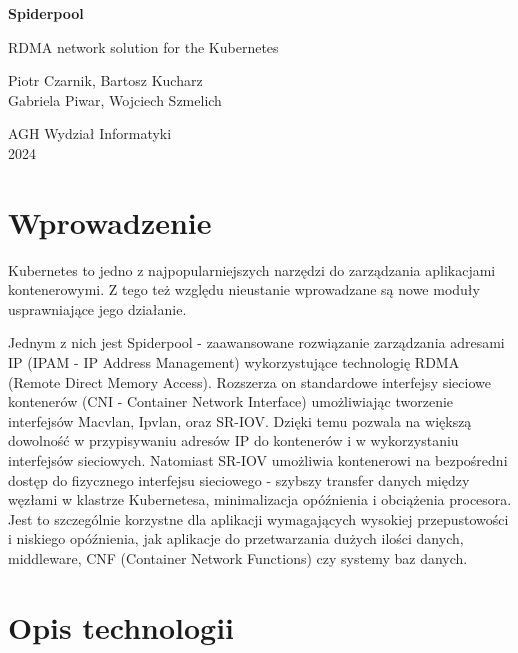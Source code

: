 \documentclass[onecolumn,12pt]{article}
\begin{document}
\begin{titlepage}
\begin{center}
\vspace*{2.5cm}
\Huge
\textbf{Spiderpool}
            
\vspace{0.5cm}
\LARGE
RDMA network solution for the Kubernetes
            
\vspace{1.5cm}

\large
Piotr Czarnik, Bartosz Kucharz
\\Gabriela Piwar, Wojciech Szmelich
              
\vspace{0.8cm}          
\Large
AGH Wydział Informatyki\\
2024    
\end{center}
\end{titlepage}

\tableofcontents
\thispagestyle{empty}
\newpage

\section{Wprowadzenie}
Kubernetes to jedno z najpopularniejszych narzędzi do zarządzania aplikacjami kontenerowymi. 
Z tego też względu nieustanie wprowadzane są nowe moduły usprawniające jego działanie. 

Jednym z nich jest Spiderpool - zaawansowane rozwiązanie zarządzania adresami IP (IPAM - IP Address Management) wykorzystujące technologię RDMA (Remote Direct Memory Access).
Rozszerza on standardowe interfejsy sieciowe kontenerów (CNI - Container Network Interface) umożliwiając tworzenie interfejsów Macvlan, Ipvlan, oraz SR-IOV.
Dzięki temu pozwala na większą dowolność w przypisywaniu adresów IP do kontenerów i w wykorzystaniu interfejsów sieciowych.
Natomiast SR-IOV umożliwia kontenerowi na bezpośredni dostęp do fizycznego interfejsu sieciowego - szybszy transfer danych między węzłami w klastrze Kubernetesa, minimalizacja opóźnienia i obciążenia procesora. 
Jest to szczególnie korzystne dla aplikacji wymagających wysokiej przepustowości i niskiego opóźnienia, 
jak aplikacje do przetwarzania dużych ilości danych, middleware, CNF (Container Network Functions) czy systemy baz danych.

\section{Opis technologii}
\end{document}
